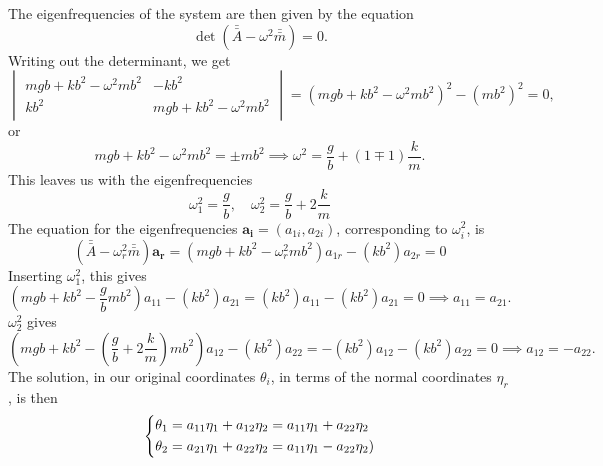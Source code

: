 \documentclass{article}
\begin{document}
        The eigenfrequencies of the system are then given by the equation
        \begin{equation*}
            \det(\bar {\bar A} - \omega^2 \bar {\bar m}) = 0.
        \end{equation*}
        Writing out the determinant, we get 
        \begin{equation*}
            \begin{vmatrix}
                mgb + kb^2 - \omega^2 mb^2 & -kb^2 \\
                kb^2 & mgb + kb^2 - \omega^2 mb^2
            \end{vmatrix}
            = (mgb + kb^2 - \omega^2 mb^2)^2 - (mb^2)^2 = 0,
        \end{equation*}
        or
        \begin{equation*}
        mgb + kb^2 - \omega^2 mb^2 = \pm mb^2 \implies \omega^2 = \frac{g}{b} + (1 \mp 1)\frac{k}{m}.
        \end{equation*}
        This leaves us with the eigenfrequencies
        \begin{equation*}
            \omega_1^2 = \frac{g}{b}, \quad \omega_2^2 = \frac{g}{b} + 2 \frac{k}{m}
        \end{equation*}
        The equation for the eigenfrequencies $\mathbf{a_i} = (a_{1i}, a_{2i})$, corresponding to $\omega_i^2$, is
        \begin{equation*}
            (\bar {\bar A} - \omega^2_r \bar {\bar m}) \mathbf{a_r} = (mgb + kb^2 - \omega_r^2 mb^2)a_{1r} -(kb^2)a_{2r} = 0
        \end{equation*}
        Inserting $\omega_1^2$, this gives 
        \begin{equation*}
            \left(mgb + kb^2 - \frac{g}{b} mb^2\right)a_{11} -(kb^2)a_{21} = (kb^2)a_{11} -(kb^2)a_{21} = 0 \implies a_{11} = a_{21}.
        \end{equation*}
        $\omega_2^2$ gives 
        \begin{equation*}
            \left(mgb + kb^2 - \left(\frac{g}{b} +2\frac{k}{m}\right)mb^2\right)a_{12} -(kb^2)a_{22} = -(kb^2)a_{12} -(kb^2)a_{22} = 0 \implies a_{12} = -a_{22}.
        \end{equation*}
        The solution, in our original coordinates $\theta_i$, in terms of the normal coordinates $\eta_r$, is then
        \begin{equation*}
            \begin{dcases}
                \theta_1 = a_{11} \eta_1 + a_{12} \eta_2 = a_{11} \eta_1 + a_{22}\eta_2 \\
                \theta_2 = a_{21} \eta_1 + a_{22} \eta_2 = a_{11} \eta_1 - a_{22} \eta_2) \\
            \end{dcases}
        \end{equation*}
\end{document}
